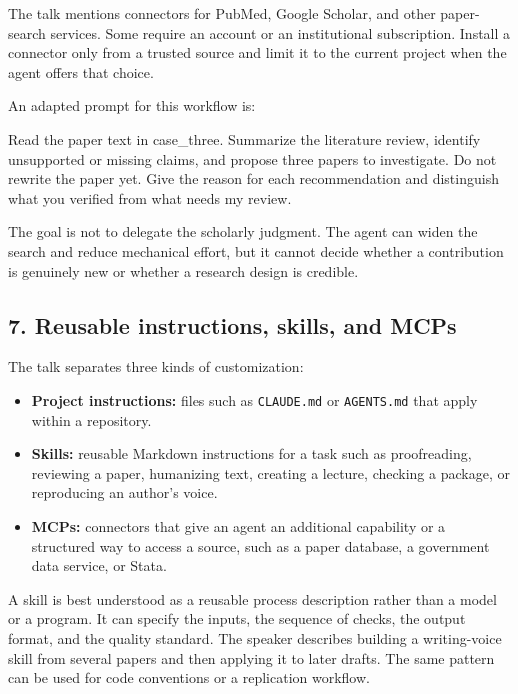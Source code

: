 \documentclass[
  english,
  10pt,
]{article}
\newenvironment{Shaded}{\begin{snugshade}}{\end{snugshade}}
\newcommand{\NormalTok}[1]{\textcolor[rgb]{0.00,0.23,0.31}{#1}}
\providecommand{\tightlist}{%
  \setlength{\itemsep}{0pt}\setlength{\parskip}{0pt}}
\begin{document}
The talk mentions connectors for PubMed, Google Scholar, and other
paper-search services. Some require an account or an institutional
subscription. Install a connector only from a trusted source and limit
it to the current project when the agent offers that choice.

An adapted prompt for this workflow is:

\begin{Shaded}
\begin{Highlighting}[]
\NormalTok{Read the paper text in case\_three. Summarize the literature review, identify}
\NormalTok{unsupported or missing claims, and propose three papers to investigate. Do not}
\NormalTok{rewrite the paper yet. Give the reason for each recommendation and distinguish}
\NormalTok{what you verified from what needs my review.}
\end{Highlighting}
\end{Shaded}

The goal is not to delegate the scholarly judgment. The agent can widen
the search and reduce mechanical effort, but it cannot decide whether a
contribution is genuinely new or whether a research design is credible.

\subsection{7. Reusable instructions, skills, and
MCPs}\label{reusable-instructions-skills-and-mcps}

The talk separates three kinds of customization:

\begin{itemize}
\tightlist
\item
  \textbf{Project instructions:} files such as \texttt{CLAUDE.md} or
  \texttt{AGENTS.md} that apply within a repository.
\item
  \textbf{Skills:} reusable Markdown instructions for a task such as
  proofreading, reviewing a paper, humanizing text, creating a lecture,
  checking a package, or reproducing an author's voice.
\item
  \textbf{MCPs:} connectors that give an agent an additional capability
  or a structured way to access a source, such as a paper database, a
  government data service, or Stata.
\end{itemize}

A skill is best understood as a reusable process description rather than
a model or a program. It can specify the inputs, the sequence of checks,
the output format, and the quality standard. The speaker describes
building a writing-voice skill from several papers and then applying it
to later drafts. The same pattern can be used for code conventions or a
replication workflow.
\end{document}
